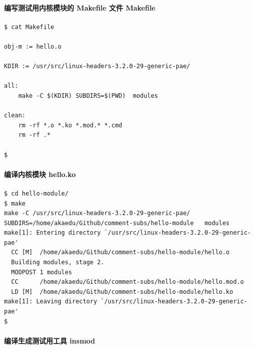 \documentclass[11pt,a4paper]{article}
\begin{document}
\paragraph{编写测试用内核模块的 Makefile 文件 Makefile}

{\begin{shaded}\begin{verbatim}
$ cat Makefile 

obj-m := hello.o

KDIR := /usr/src/linux-headers-3.2.0-29-generic-pae/

all:
    make -C $(KDIR) SUBDIRS=$(PWD)  modules

clean:
    rm -rf *.o *.ko *.mod.* *.cmd 
    rm -rf .*

$ 
\end{verbatim}\end{shaded}}
\paragraph{编译内核模块 hello.ko}

{\begin{shaded}\begin{verbatim}
$ cd hello-module/ 
$ make
make -C /usr/src/linux-headers-3.2.0-29-generic-pae/    SUBDIRS=/home/akaedu/Github/comment-subs/hello-module   modules
make[1]: Entering directory `/usr/src/linux-headers-3.2.0-29-generic-pae'
  CC [M]  /home/akaedu/Github/comment-subs/hello-module/hello.o
  Building modules, stage 2.
  MODPOST 1 modules
  CC      /home/akaedu/Github/comment-subs/hello-module/hello.mod.o
  LD [M]  /home/akaedu/Github/comment-subs/hello-module/hello.ko
make[1]: Leaving directory `/usr/src/linux-headers-3.2.0-29-generic-pae'
$ 
\end{verbatim}\end{shaded}}
\paragraph{编译生成测试用工具 insmod}
\end{document}
